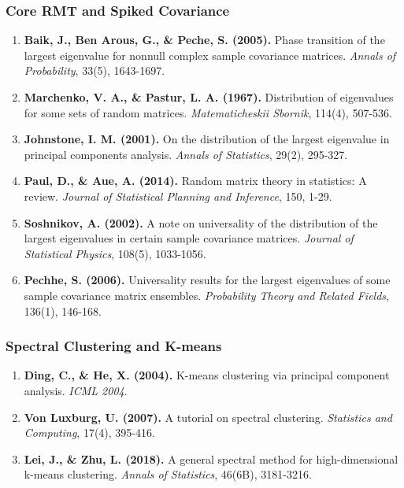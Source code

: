 \documentclass[
  12pt,
]{article}
\begin{document}
\subsubsection{Core RMT and Spiked
Covariance}\label{core-rmt-and-spiked-covariance}

\begin{enumerate}
\def\labelenumi{\arabic{enumi}.}
\item
  \textbf{Baik, J., Ben Arous, G., \& Peche, S. (2005).} Phase
  transition of the largest eigenvalue for nonnull complex sample
  covariance matrices. \emph{Annals of Probability}, 33(5), 1643-1697.
\item
  \textbf{Marchenko, V. A., \& Pastur, L. A. (1967).} Distribution of
  eigenvalues for some sets of random matrices. \emph{Matematicheskii
  Sbornik}, 114(4), 507-536.
\item
  \textbf{Johnstone, I. M. (2001).} On the distribution of the largest
  eigenvalue in principal components analysis. \emph{Annals of
  Statistics}, 29(2), 295-327.
\item
  \textbf{Paul, D., \& Aue, A. (2014).} Random matrix theory in
  statistics: A review. \emph{Journal of Statistical Planning and
  Inference}, 150, 1-29.
\item
  \textbf{Soshnikov, A. (2002).} A note on universality of the
  distribution of the largest eigenvalues in certain sample covariance
  matrices. \emph{Journal of Statistical Physics}, 108(5), 1033-1056.
\item
  \textbf{Pechhe, S. (2006).} Universality results for the largest
  eigenvalues of some sample covariance matrix ensembles.
  \emph{Probability Theory and Related Fields}, 136(1), 146-168.
\end{enumerate}

\subsubsection{Spectral Clustering and
K-means}\label{spectral-clustering-and-k-means}

\begin{enumerate}
\def\labelenumi{\arabic{enumi}.}
\setcounter{enumi}{6}
\item
  \textbf{Ding, C., \& He, X. (2004).} K-means clustering via principal
  component analysis. \emph{ICML 2004}.
\item
  \textbf{Von Luxburg, U. (2007).} A tutorial on spectral clustering.
  \emph{Statistics and Computing}, 17(4), 395-416.
\item
  \textbf{Lei, J., \& Zhu, L. (2018).} A general spectral method for
  high-dimensional k-means clustering. \emph{Annals of Statistics},
  46(6B), 3181-3216.
\end{enumerate}
\end{document}
